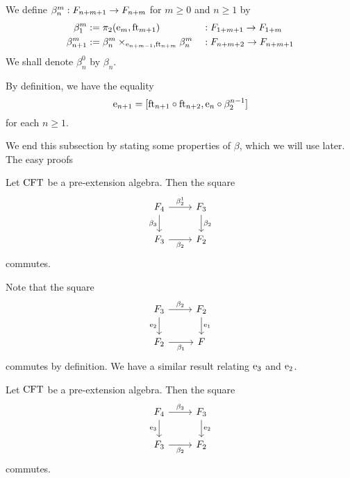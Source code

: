 \begin{defn}
We define $\beta^m_n:\stesysf_{n+m+1}\to\stesysf_{n+m}$ for 
$m\geq 0$ and $n\geq 1$
by
\begin{align*}
\beta^m_1 
  & := 
\pullbackpr{2}{\eext{m}}{\eft[m+1]}
  & &
  : \stesysf_{1+m+1}\to\stesysf_{1+m}
  \\
\beta^m_{n+1}
  & :=
\pullback{\beta^m_n}{\beta^m_n}{\eext{n+m-1}}{\eft[n+m]}
  & &
  : \stesysf_{n+m+2}\to\stesysf_{n+m+1}
\end{align*}
We shall denote $\beta^0_n$ by $\beta_n$.
\end{defn}

\begin{rmk}
By definition, we have the equality
\begin{equation}
\eext{n+1}=[\eft[n+1]\circ\eft[n+2],\eext{n}\circ\beta^{n-1}_2]
\end{equation}
for each $n\geq 1$.
\end{rmk}

We end this subsection by stating some properties of $\beta$, which we will
use later. The easy proofs 
\begin{lem}\label{lem:beta_beta}
Let $\stesys$ be a pre-extension algebra. Then the square
\begin{equation*}
\begin{tikzcd}
\stesysf_4
  \ar{r}{\beta^1_2}
  \ar{d}[swap]{\beta_3}
  &
\stesysf_3
  \ar{d}{\beta_2}
  \\
\stesysf_3
  \ar{r}[swap]{\beta_2}
  & 
\stesysf_2
\end{tikzcd}
\end{equation*}
commutes.
\end{lem}

Note that the square
\begin{equation*}
\begin{tikzcd}
\stesysf_3
  \ar{r}{\beta_2}
  \ar{d}[swap]{\eext{2}}
  &
\stesysf_2
  \ar{d}{\efamext}
  \\
\stesysf_2
  \ar{r}[swap]{\beta_1}
  &
\stesysf
\end{tikzcd}
\end{equation*}
commutes by definition. We have a similar result relating $\eext{3}$ and
$\eext{2}$.

\begin{lem}\label{lem:beta_ext}
Let $\stesys$ be a pre-extension algebra. Then the square
\begin{equation*}
\begin{tikzcd}
\stesysf_4
  \ar{r}{\beta_3}
  \ar{d}[swap]{\eext{3}}
  &
\stesysf_3
  \ar{d}{\eext{2}}
  \\
\stesysf_3
  \ar{r}[swap]{\beta_2}
  &
\stesysf_2
\end{tikzcd}
\end{equation*}
commutes.
\end{lem}

